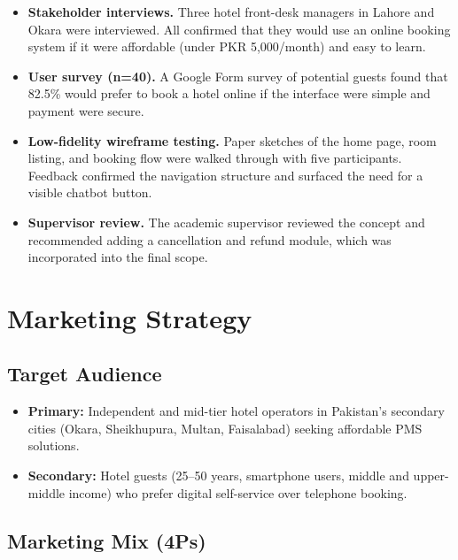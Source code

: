 \documentclass[12pt,a4paper]{report}
\begin{document}
\begin{itemize}[leftmargin=*, label=\textbullet]
  \item \textbf{Stakeholder interviews.} Three hotel front-desk managers in Lahore and Okara were interviewed. All confirmed that they would use an online booking system if it were affordable (under PKR 5,000/month) and easy to learn.
  \item \textbf{User survey (n=40).} A Google Form survey of potential guests found that 82.5\% would prefer to book a hotel online if the interface were simple and payment were secure.
  \item \textbf{Low-fidelity wireframe testing.} Paper sketches of the home page, room listing, and booking flow were walked through with five participants. Feedback confirmed the navigation structure and surfaced the need for a visible chatbot button.
  \item \textbf{Supervisor review.} The academic supervisor reviewed the concept and recommended adding a cancellation and refund module, which was incorporated into the final scope.
\end{itemize}

\section{Marketing Strategy}

\subsection*{Target Audience}

\begin{itemize}[leftmargin=*, label=\textbullet]
  \item \textbf{Primary:} Independent and mid-tier hotel operators in Pakistan's secondary cities (Okara, Sheikhupura, Multan, Faisalabad) seeking affordable PMS solutions.
  \item \textbf{Secondary:} Hotel guests (25--50 years, smartphone users, middle and upper-middle income) who prefer digital self-service over telephone booking.
\end{itemize}

\subsection*{Marketing Mix (4Ps)}
\end{document}
